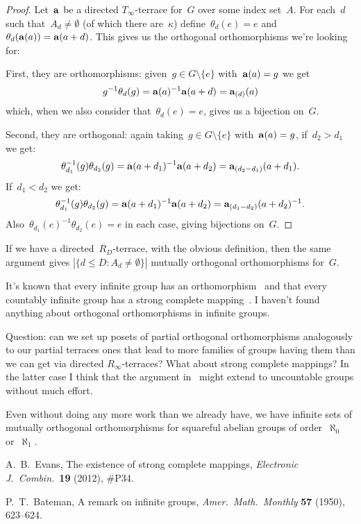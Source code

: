 \documentclass[a4paper,12pt]{article}
\begin{document}
\begin{proof}
Let~${\bf a}$ be a directed $T_{\infty}$-terrace for~$G$ over some index set~$A$.  For each~$d$ such that~$A_d \neq \emptyset$ (of which there are~$\kappa$) define~$\theta_d(e) = e$ and $\theta_d( {\bf a}(a) ) = {\bf a}(a+d)$.  This gives us the orthogonal orthomorphisms we're looking for:

First, they are orthomorphisms: given~$g \in G \setminus \{ e \}$ with~${\bf a}(a) = g$ we get
$$g^{-1}\theta_d(g) = {\bf a}(a)^{-1}{\bf a}(a+d) = {\bf a}_{(d)}(a)$$
which, when we also consider that~$\theta_d(e)=e$, gives us a bijection on~$G$.

Second, they are orthogonal: again taking~$g \in G \setminus \{ e \}$ with~${\bf a}(a) = g$, if~$d_2 > d_1$ we get: 
$$\theta_{d_1}^{-1}(g) \theta_{d_2}(g) =  {\bf a}(a+d_1)^{-1}{\bf a}(a+d_2)  = {\bf a}_{(d_2 - d_1)}(a+d_1) .       $$
If~$d_1 < d_2$ we get:
$$\theta_{d_1}^{-1}(g) \theta_{d_2}(g) =  {\bf a}(a+d_1)^{-1}{\bf a}(a+d_2)  = {\bf a}_{(d_1 - d_2)}(a+d_2)^{-1} .       $$
Also~$\theta_{d_1}(e)^{-1}\theta_{d_2}(e) =e$ in each case, giving bijections on~$G$.
\end{proof}

If we have a directed~$R_D$-terrace, with the obvious definition, then the same argument gives $ | \{ d \leq D : A_d \neq \emptyset \} |$ mutually orthogonal orthomorphisms for~$G$.

It's known that every infinite group has an orthomorphism~\cite{Bateman50} and that every countably infinite group has a strong complete mapping~\cite{Evans12}.  I haven't found anything about orthogonal orthomorphisms in infinite groups.


Question: can we set up posets of partial orthogonal orthomorphisms analogously to our partial terraces ones that lead to more families of groups having them than we can get via directed $R_{\infty}$-terraces?  What about strong complete mappings? In the latter case I think that the argument in~\cite{Evans12} might extend to uncountable groups without much effort.

Even without doing any more work than we already have, we have infinite sets of mutually orthogonal orthomorphisms for squareful abelian groups of order~$\aleph_0$ or~$\aleph_1$.



\begin{thebibliography}{99}

A.~B.~Evans, The existence of strong complete mappings, {\em Electronic J.~Combin.}~{\bf 19} (2012), \#P34.

P.~T.~Bateman, A remark on infinite groups, {\em Amer.~Math.~Monthly} {\bf 57} (1950), 623--624.




\end{thebibliography}
\end{document}
